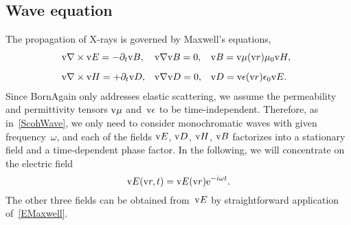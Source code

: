 \subsection{Wave equation}\label{SXwave}

The propagation of X-rays is governed by Maxwell's equations,
%
%
\begin{equation}\label{EMaxwell}
  \begin{array}{@{}l@{\quad}l@{\quad}l}
    \Nabla\times\v{E}=-\partial_t \v{B},
   &\Nabla\v{B}=0,
   &\v{B}=\v{\mu}(\r)\mu_0\v{H},
   \\[2ex]
    \Nabla\times\v{H}=+\partial_t \v{D},
   &\Nabla\v{D}=0,
   &\v{D}=\v{\eps}(\r)\eps_0\v{E}.
  \end{array}
\end{equation}
%
%
%
%
%
%
%
%
Since BornAgain only addresses elastic scattering,
%
%
we assume the permeability and permittivity tensors $\text{v}\mu$ and~$\text{v}\epsilon$
to be time-independent.
%
Therefore, as in~\cref{ScohWave}, we only need to consider monochromatic waves
%
%
with given frequency~$\omega$,
and each of the fields $\text{v}{E}$, $\text{v}{D}$, $\text{v}{H}$, $\text{v}{B}$
factorizes into a stationary field and a time-dependent phase factor.
%
In the following, we will concentrate on the electric field
%
\begin{equation}
  \text{v}{E}(\text{v}{r},t) = \text{v}{E}(\text{v}{r})\mathrm e^{-i\omega t}.
\end{equation}
The other three fields can be obtained from~$\text{v}{E}$
by straightforward application of~\cref{EMaxwell}.


